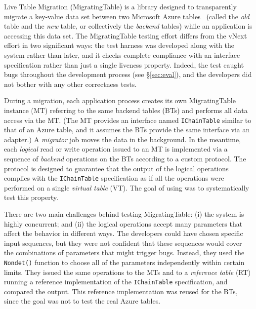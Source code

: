 %
Live Table Migration (MigratingTable) is a library designed to transparently migrate a key-value data set between two Microsoft Azure tables~\cite{azure-table} (called the \emph{old} table and the \emph{new} table, or collectively the \emph{backend} tables) while an application is accessing this data set. The MigratingTable testing effort differs from the vNext effort in two significant ways: the \psharp test harness was developed along with the system rather than later, and it checks complete compliance with an interface specification rather than just a single liveness property. Indeed, the \psharp test caught bugs throughout the development process (see \S\ref{sec:eval}), and the developers did not bother with any other correctness tests.

During a migration, each application process creates its own MigratingTable instance (MT) referring to the same backend tables (BTs) and performs all data access via the MT. (The MT provides an interface named \texttt{IChainTable} similar to that of an Azure table, and it assumes the BTs provide the same interface via an adapter.) A \emph{migrator} job moves the data in the background. In the meantime, each \emph{logical} read or write operation issued to an MT is implemented via a sequence of \emph{backend} operations on the BTs according to a custom protocol. The protocol is designed to guarantee that the output of the logical operations complies with the \texttt{IChainTable} specification as if all the operations were performed on a single \emph{virtual table} (VT). The goal of using \psharp was to systematically test this property.

There are two main challenges behind testing MigratingTable: (i) the system is highly concurrent; and (ii) the logical operations accept many parameters that affect the behavior in different ways. The developers could have chosen specific input sequences, but they were not confident that these sequences would cover the combinations of parameters that might trigger bugs. Instead, they used the \psharp \texttt{Nondet()} function to choose all of the parameters independently within certain limits. They issued the same operations to the MTs and to a \emph{reference table} (RT) running a reference implementation of the \texttt{IChainTable} specification, and compared the output. This reference implementation was reused for the BTs, since the goal was not to test the real Azure tables.

